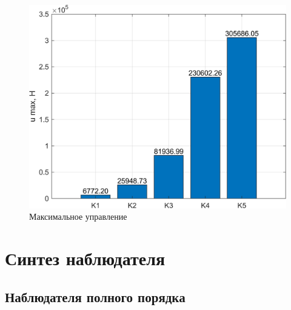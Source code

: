 \begin{figure}[H]
    \centering
    \includegraphics[width=\linewidth]{figs/3.2.sim_u.png}
    \caption{Максимальное управление}
    \label{fig:3.2.sim_u}
\end{figure}

\section{Синтез наблюдателя}

\subsection{Наблюдателя полного порядка}

